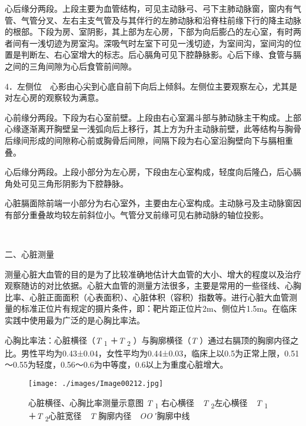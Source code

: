 心后缘分两段。上段主要为血管结构，可见主动脉弓、弓下主肺动脉窗，窗内有气管、气管分叉、左右主支气管及与其伴行的左肺动脉和沿脊柱前缘下行的降主动脉的根部。下段为房、室阴影，其上部为左心房，下部为向后膨凸的左心室，有时两者间有一浅切迹为房室沟。深吸气时左室下可见一浅切迹，为室间沟，室间沟的位置是判断左、右心室增大的标志。后心膈角可见下腔静脉影。心后下缘、食管与膈之间的三角间隙为心后食管前间隙。

4．左侧位　心影由心尖到心底自前下向后上倾斜。左侧位主要观察左心，尤其是对左心房的观察较为满意。

心前缘分两段。下段为右心室前壁。上段由右心室漏斗部与肺动脉主干构成。上部心缘逐渐离开胸壁呈一浅弧向后上移行，其上方为升主动脉前壁，此等结构与胸骨后缘间形成的间隙称心前或胸骨后间隙，间隔下段为右心室沿胸壁向下与膈相重叠。

心后缘分两段。上段小部分为左心房，下段由左心室构成，轻度向后隆凸，后心膈角处可见三角形阴影为下腔静脉。

心脏膈面除前端一小部分为右心室外，主要由左心室构成。主动脉弓及主动脉窗因有部分重叠故均较左前斜位小。气管分叉前缘可见右肺动脉的轴位投影。

\begin{figure}
  \centering
{}
\\
\caption{}
\label{fig4-1-4}
\end{figure}

二、心脏测量

测量心脏大血管的目的是为了比较准确地估计大血管的大小、增大的程度以及治疗观察随访的对比依据。心脏大血管的测量方法很多，主要是常用的一些径线、心胸比率、心脏正面面积（心表面积）、心脏体积（容积）指数等。进行心脏大血管测量的标准正位片有规定的摄片条件，即：靶片距正位片2m、侧位片1.5m。在临床实践中使用最为广泛的是心胸比率法。

心胸比率法：心脏横径（\emph{T} \textsubscript{1} ＋\emph{T}
\textsubscript{2} ）与胸廓横径（\emph{T}
）通过右膈顶的胸廓内径之比。男性平均为0.43±0.04，女性平均为0.44±0.03，临床上以0.5为正常上限，0.51～0.55为轻度，0.56～0.6为中等度，0.6以上为重度心脏增大。

\begin{figure}[!htbp]
 \centering
 \texttt{[image: ./images/Image00212.jpg]}
 \captionsetup{justification=centering}
 \caption{心脏横径、心胸比率测量示意图 {\small \emph{T} \textsubscript{1} 右心横径　\emph{T} \textsubscript{2}左心横径　\emph{T} \textsubscript{1} ＋\emph{T} \textsubscript{2}心脏宽径　\emph{T} 胸廓内径　\emph{OO} ′胸廓中线}}
 \label{fig4-1-5}
  \end{figure} 

